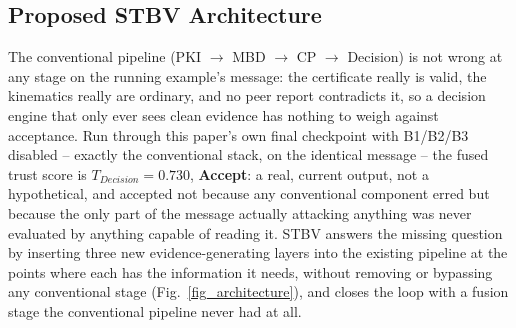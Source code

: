 \documentclass[conference]{IEEEtran}
\begin{document}
\subsection{Proposed STBV Architecture}
\label{sec:whyworks}
\label{sec:whyfail}
The conventional pipeline (PKI $\to$ MBD $\to$ CP $\to$ Decision) is not wrong at any stage on the running example's message: the certificate really is valid, the kinematics really are ordinary, and no peer report contradicts it, so a decision engine that only ever sees clean evidence has nothing to weigh against acceptance. Run through this paper's own final checkpoint with B1/B2/B3 disabled -- exactly the conventional stack, on the identical message -- the fused trust score is $T_{Decision}{=}0.730$, \textbf{Accept}: a real, current output, not a hypothetical, and accepted not because any conventional component erred but because the only part of the message actually attacking anything was never evaluated by anything capable of reading it. STBV answers the missing question by inserting three new evidence-generating layers into the existing pipeline at the points where each has the information it needs, without removing or bypassing any conventional stage (Fig.~\ref{fig_architecture}), and closes the loop with a fusion stage the conventional pipeline never had at all.
\end{document}
